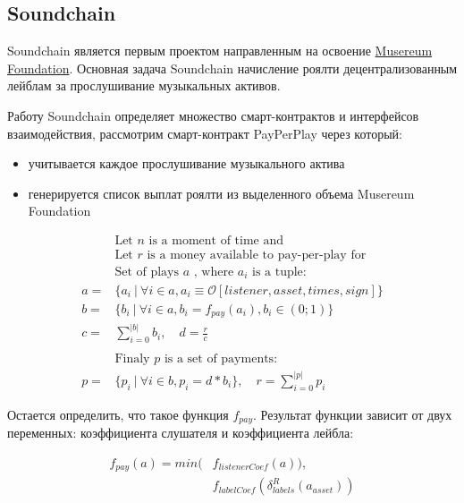 \documentclass[12pt]{report}
\begin{document}
\subsection{Soundchain}
\label{tech-apps-soundchain}
\begin{multicols}{2}
Soundchain является первым проектом направленным на освоение \hyperref[tech-blockchain-reward]{Musereum Foundation}. Основная задача Soundchain начисление роялти децентрализованным лейблам за прослушивание музыкальных активов. 

Работу Soundchain определяет множество смарт-контрактов и интерфейсов взаимодействия, рассмотрим смарт-контракт PayPerPlay через который:
\begin{itemize}
	\item учитывается каждое прослушивание музыкального актива
	\item генерируется список выплат роялти из выделенного объема Musereum Foundation
\end{itemize}
\end{multicols}
\begin{align}
& \text {Let } n \text{ is a moment of time and} \nonumber\\
& \text{Let } r \text{ is a money available to pay-per-play for} \nonumber\\
& \text{Set of plays } a \text{ , where } a_i \text{ is a tuple:}  \nonumber\\
a = &\{a_i \ | \ \forall i \in a, a_i \equiv \mathcal{O}[listener, asset, times, sign] \} \\
b = &\{b_i \ | \ \forall i \in a, b_i = f_{pay}(a_i), b_i \in (0; 1) \} \\ 
c = &\sum\limits^{|b|}_{i=0} b_i, \quad d = \frac{r}{c} \\
& \nonumber\\
& \text{Finaly } p \text{ is a set of payments: } \nonumber\\
p = &\{ p_i \ | \ \forall i \in b, p_i = d * b_i \}, \quad r = \sum\limits^{|p|}_{i=0} p_i
\end{align}

Остается определить, что такое функция $f_{pay}$. Результат функции зависит от двух переменных: коэффициента слушателя и коэффициента лейбла: 

\begin{align}
f_{pay}(a) = min(&f_{listenerCoef}(a)),\\
						 &f_{labelCoef}(\delta^{R}_{labels}(a_{asset}))
\end{align}
\end{document}
